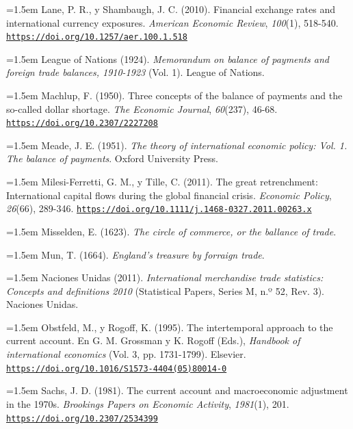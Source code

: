 \documentclass[10pt,a4paper]{article}
\begin{document}
\noindent\hangindent=1.5em Lane, P. R., y Shambaugh, J. C. (2010). Financial exchange rates and international currency exposures. \textit{American Economic Review}, \textit{100}(1), 518-540. \href{https://doi.org/10.1257/aer.100.1.518}{\nolinkurl{https://doi.org/10.1257/aer.100.1.518}}

\noindent\hangindent=1.5em League of Nations (1924). \textit{Memorandum on balance of payments and foreign trade balances, 1910-1923} (Vol. 1). League of Nations.

\noindent\hangindent=1.5em Machlup, F. (1950). Three concepts of the balance of payments and the so-called dollar shortage. \textit{The Economic Journal}, \textit{60}(237), 46-68. \href{https://doi.org/10.2307/2227208}{\nolinkurl{https://doi.org/10.2307/2227208}}

\noindent\hangindent=1.5em Meade, J. E. (1951). \textit{The theory of international economic policy: Vol. 1. The balance of payments}. Oxford University Press.

\noindent\hangindent=1.5em Milesi-Ferretti, G. M., y Tille, C. (2011). The great retrenchment: International capital flows during the global financial crisis. \textit{Economic Policy}, \textit{26}(66), 289-346. \href{https://doi.org/10.1111/j.1468-0327.2011.00263.x}{\nolinkurl{https://doi.org/10.1111/j.1468-0327.2011.00263.x}}

\noindent\hangindent=1.5em Misselden, E. (1623). \textit{The circle of commerce, or the ballance of trade}.

\noindent\hangindent=1.5em Mun, T. (1664). \textit{England's treasure by forraign trade}.

\noindent\hangindent=1.5em Naciones Unidas (2011). \textit{International merchandise trade statistics: Concepts and definitions 2010} (Statistical Papers, Series M, n.º 52, Rev. 3). Naciones Unidas.

\noindent\hangindent=1.5em Obstfeld, M., y Rogoff, K. (1995). The intertemporal approach to the current account. En G. M. Grossman y K. Rogoff (Eds.), \textit{Handbook of international economics} (Vol. 3, pp. 1731-1799). Elsevier. \href{https://doi.org/10.1016/S1573-4404(05)80014-0}{\nolinkurl{https://doi.org/10.1016/S1573-4404(05)80014-0}}

\noindent\hangindent=1.5em Sachs, J. D. (1981). The current account and macroeconomic adjustment in the 1970s. \textit{Brookings Papers on Economic Activity}, \textit{1981}(1), 201. \href{https://doi.org/10.2307/2534399}{\nolinkurl{https://doi.org/10.2307/2534399}}
\end{document}
